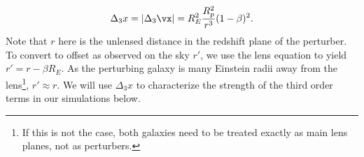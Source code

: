 \begin{equation}
\Delta_3 x = | \Delta_3 \vx| = R_E^2 \frac{R_p^2}{r^3} (1 - \beta)^2. 
\end{equation}
Note that $r$ here is the unlensed distance in the redshift plane of the perturber. To convert to offset as observed on the sky $r'$, we use the lens equation to yield $r' = r - \beta R_E$. As the perturbing galaxy is many Einstein radii away from the lens\footnote{If this is not the case, both galaxies need to be treated exactly as main lens planes, not as perturbers.}, $r' \approx r$. We will use $\Delta_3 x$ to characterize the strength of the third order terms in our simulations below.
  